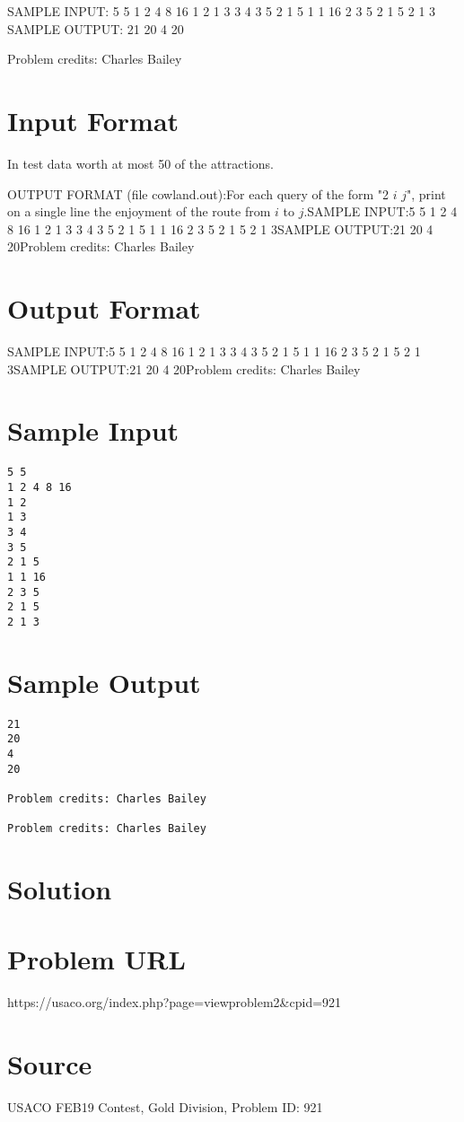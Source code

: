 \documentclass[12pt]{article}
\begin{document}
SAMPLE INPUT:
5 5
1 2 4 8 16
1 2
1 3
3 4
3 5
2 1 5
1 1 16
2 3 5
2 1 5
2 1 3
SAMPLE OUTPUT: 
21
20
4
20


Problem credits: Charles Bailey



\section*{Input Format}
In test data worth at most 50%
of the attractions.

OUTPUT FORMAT (file cowland.out):For each query of the form "2 $i$ $j$", print on a single line the enjoyment of
the route from $i$ to $j$.SAMPLE INPUT:5 5
1 2 4 8 16
1 2
1 3
3 4
3 5
2 1 5
1 1 16
2 3 5
2 1 5
2 1 3SAMPLE OUTPUT:21
20
4
20Problem credits: Charles Bailey

\section*{Output Format}
SAMPLE INPUT:5 5
1 2 4 8 16
1 2
1 3
3 4
3 5
2 1 5
1 1 16
2 3 5
2 1 5
2 1 3SAMPLE OUTPUT:21
20
4
20Problem credits: Charles Bailey

\section*{Sample Input}
\begin{verbatim}
5 5
1 2 4 8 16
1 2
1 3
3 4
3 5
2 1 5
1 1 16
2 3 5
2 1 5
2 1 3
\end{verbatim}

\section*{Sample Output}
\begin{verbatim}
21
20
4
20

Problem credits: Charles Bailey

Problem credits: Charles Bailey
\end{verbatim}

\section*{Solution}


\section*{Problem URL}
https://usaco.org/index.php?page=viewproblem2&cpid=921

\section*{Source}
USACO FEB19 Contest, Gold Division, Problem ID: 921
\end{document}
